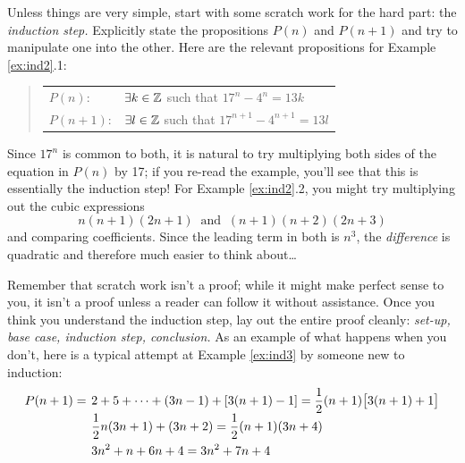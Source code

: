 Unless things are very simple, start with some scratch work for the hard part: the \emph{induction step.} Explicitly state the propositions $P(n)$ and $P(n+1)$ and try to manipulate one into the other. Here are the relevant propositions for Example \ref{ex:ind2}.1:
\begin{quote}
	\begin{tabular}{ll}
		$P(n)$: &$\exists k\in\mathbb{Z}$ such that $17^n-4^n=13k$\\[5pt]
		$P(n+1)$: &$\exists l\in\mathbb{Z}$ such that $17^{n+1}-4^{n+1}=13l$
	\end{tabular}
\end{quote}
Since $17^n$ is common to both, it is natural to try multiplying both sides of the equation in $P(n)$ by 17; if you re-read the example, you'll see that this is essentially the induction step! For Example \ref*{ex:ind2}.2, you might try multiplying out the cubic expressions
\[
	n(n+1)(2n+1)\ \text{ and }\ (n+1)(n+2)(2n+3)
\]
and comparing coefficients. Since the leading term in both is $n^3$, the \emph{difference} is quadratic and therefore much easier to think about\ldots\smallbreak

Remember that scratch work isn't a proof; while it might make perfect sense to you, it isn't a proof unless a reader can follow it without assistance. Once you think you understand the induction step, lay out the entire proof cleanly: \emph{set-up, base case, induction step, conclusion.} As an example of what happens when you don't, here is a typical attempt at Example \ref{ex:ind3} by someone new to induction:

\begin{tcolorbox}[exstyle]\vspace{-10pt}
	\begin{align*}
		P(n+1)=\hspace{4pt}
		&2+5+\cdots+(3n-1)+[3(n+1)-1] =\smash{\frac 12}(n+1)\bigl[3(n+1)+1\bigr]\\
		&\frac 12n(3n+1)+(3n+2) =\frac 12(n+1)(3n+4)\\
		&3n^2+n+6n+4 =3n^2+7n+4
	\end{align*}
\end{tcolorbox}

